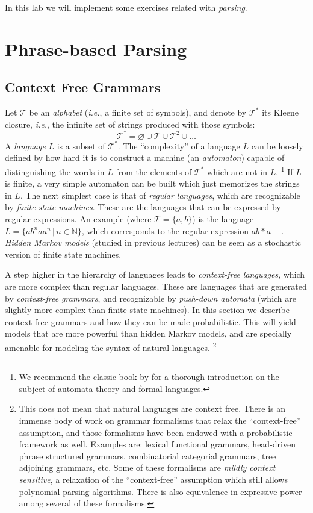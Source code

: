 
In this lab we will implement some exercises related with \emph{parsing}. 

\section{Phrase-based Parsing}

\subsection{Context Free Grammars}

Let $\mathcal{T}$ be an \emph{alphabet} (\emph{i.e.}, a finite set of symbols), and denote by $\mathcal{T}^*$ its Kleene closure, \emph{i.e.}, the 
infinite set of strings produced with those symbols: 
$$\mathcal{T}^* = \varnothing \cup \mathcal{T} \cup \mathcal{T}^2 \cup \ldots$$ 
A \emph{language} $L$ is a subset of $\mathcal{T}^*$. 
The ``complexity'' of a language $L$ can be loosely defined by how hard it is to construct a machine (an \emph{automaton}) capable 
of distinguishing the words in $L$ from the elements of   $\mathcal{T}^*$ which are not in $L$.%
\footnote{We recommend the classic book by \citet{Hopcroft1979} for a thorough introduction on the subject of 
automata theory and formal languages.} %
If $L$ is finite, a very simple automaton can be built which just memorizes the strings in $L$. 
The next simplest case is that of \emph{regular languages}, which are recognizable by \emph{finite state machines}. 
These are the languages that can be expressed by regular expressions. 
An example (where $\mathcal{T} = \{a,b\}$) is the language $L = \{ab^naa^n \,|\,n \in \mathbb{N}\}$, which corresponds to 
the regular expression $ab*a+$. 
\emph{Hidden Markov models} (studied in previous lectures) can be seen as a stochastic version of finite state machines.  

A step higher in the hierarchy of languages leads to \emph{context-free languages}, which are more complex than regular languages. 
These are languages that are generated by \emph{context-free grammars}, and recognizable by \emph{push-down automata} 
(which are slightly more complex than finite state machines). In this section we describe context-free grammars and how 
they can be made probabilistic. This will yield models that are more powerful than hidden Markov models, and are 
specially amenable for modeling the syntax of natural languages.%
\footnote{This does not mean that natural languages are context free. There is an immense body of work on grammar formalisms that 
relax the ``context-free'' assumption, and those formalisms have been endowed with a probabilistic framework as well. Examples are: 
lexical functional grammars, head-driven phrase structured grammars, combinatorial categorial grammars, tree adjoining grammars, etc. Some 
of these formalisms are \emph{mildly context sensitive}, a relaxation of the ``context-free'' assumption which still allows polynomial parsing 
algorithms. There is also equivalence in expressive power among several of these formalisms.} %

